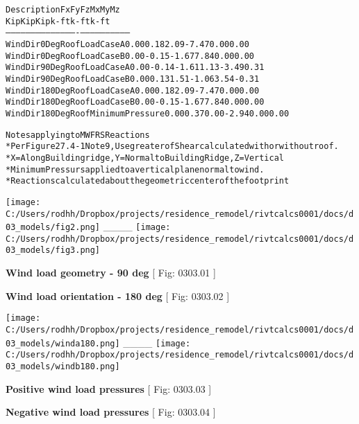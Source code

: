 \documentclass[12pt,notitle,letterpaper]{report}
\renewenvironment{quote}
  {\small\list{}{\rightmargin=0cm \leftmargin=0cm}%
   \item\relax}
  {\endlist}
\providecommand*{\DUtransition}{%
  \hspace*{\fill}\hrulefill\hspace*{\fill}
  \vskip 0.5\baselineskip
}
\begin{document}
\begin{quote}
\begin{alltt}
                 Description                Fx   Fy    Fz    Mx    My    Mz
                                           Kip   Kip   Kip  k-ft  k-ft  k-ft
    -------------------------------------- ---- ----- ----- ----- ----- -----
    Wind Dir 0 Deg Roof Load Case A        0.00  0.18  2.09 -7.47  0.00  0.00
    Wind Dir 0 Deg Roof Load Case B        0.00 -0.15 -1.67  7.84  0.00  0.00
    Wind Dir 90 Deg Roof Load Case A       0.00 -0.14 -1.61  1.13 -3.49  0.31
    Wind Dir 90 Deg Roof Load Case B       0.00  0.13  1.51 -1.06  3.54 -0.31
    Wind Dir 180 Deg Roof Load Case A      0.00  0.18  2.09 -7.47  0.00  0.00
    Wind Dir 180 Deg Roof Load Case B      0.00 -0.15 -1.67  7.84  0.00  0.00
    Wind Dir 180 Deg Roof Minimum Pressure 0.00  0.37  0.00 -2.94  0.00  0.00



       Notes applying to MWFRS Reactions
       * Per Figure 27.4-1 Note 9, Use greater of Shear calculated with or without roof.
       * X= Along Building ridge, Y = Normal to Building Ridge, Z = Vertical
       * Minimum Pressurs applied to a vertical plane normal to wind.
       * Reactions calculated about the geometric center of the footprint
\end{alltt}
\end{quote}

\DUtransition

\texttt{[image: C:/Users/rodhh/Dropbox/projects/residence\_remodel/rivtcalcs0001/docs/d03\_models/fig2.png]}  \_\_\_\_  \texttt{[image: C:/Users/rodhh/Dropbox/projects/residence\_remodel/rivtcalcs0001/docs/d03\_models/fig3.png]}

\textbf{Wind load geometry - 90 deg} \hfill {[} Fig: 0303.01 {]}

\textbf{Wind load orientation - 180 deg} \hfill {[} Fig: 0303.02 {]}

\texttt{[image: C:/Users/rodhh/Dropbox/projects/residence\_remodel/rivtcalcs0001/docs/d03\_models/winda180.png]}  \_\_\_\_  \texttt{[image: C:/Users/rodhh/Dropbox/projects/residence\_remodel/rivtcalcs0001/docs/d03\_models/windb180.png]}

\textbf{Positive wind load pressures} \hfill {[} Fig: 0303.03 {]}

\textbf{Negative wind load pressures} \hfill {[} Fig: 0303.04 {]}
\end{document}
